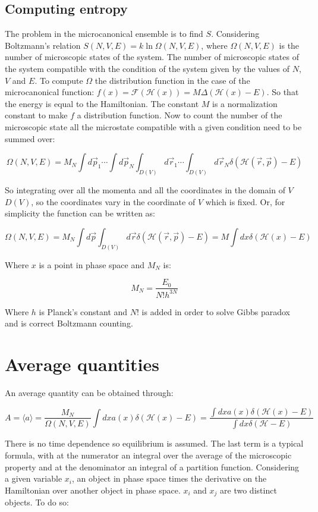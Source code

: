 	\subsection{Computing entropy}
	The problem in the microcanonical ensemble is to find $S$.
	Considering Boltzmann's relation $S(N, V, E) = k\ln\Omega(N, V, E)$, where $\Omega(N, V, E)$ is the number of microscopic states of the system.
	The number of microscopic states of the system compatible with the condition of the system given by the values of $N$, $V$ and $E$.
	To compute $\Omega$ the distribution function in the case of the microcanonical function: $f(x) = \mathcal{F}(\mathcal{H}(x)) = M\Delta(\mathcal{H}(x)-E)$.
	So that the energy is equal to the Hamiltonian.
	The constant $M$ is a normalization constant to make $f$ a distribution function.
	Now to count the number of the microscopic state all the microstate compatible with a given condition need to be summed over:

	$$\Omega(N, V, E) = M_N\int d\vec{p}_1\cdots\int d\vec{p}_N\int_{D(V)}d\vec{r}_1\cdots\int_{D(V)}d\vec{r}_N\delta(\mathcal{H}(\vec{r}, \vec{p})-E)$$

	So integrating over all the momenta and all the coordinates in the domain of $V$ $D(V)$, so the coordinates vary in the coordinate of $V$ which is fixed.
	Or, for simplicity the function can be written as:

	$$\Omega(N, V, E) = M_N\int d\vec{p}\int_{D(V)}d\vec{r}\delta(\mathcal{H}(\vec{r}, \vec{p})-E) = M\int dx\delta(\mathcal{H}(x)-E)$$

	Where $x$ is a point in phase space and $M_N$ is:

	$$M_N = \frac{E_0}{N!h^{3N}}$$

	Where $h$ is Planck's constant and $N!$ is added in order to solve Gibbs paradox and is correct Boltzmann counting.

\section{Average quantities}
	An average quantity can be obtained through:

	$$A = \langle a\rangle = \frac{M_N}{\Omega(N, V, E)}\int dx a(x)\delta(\mathcal{H}(x)-E) = \frac{\int dxa(x)\delta(\mathcal{H}(x)-E)}{\int dx\delta(\mathcal{H}-E)}$$

	There is no time dependence so equilibrium is assumed.
	The last term is a typical formula, with at the numerator an integral over the average of the microscopic property and at the denominator an integral of a partition function.
	Considering a given variable $x_i$, an object in phase space times the derivative on the Hamiltonian over another object in phase space.
	$x_i$ and $x_j$ are two distinct objects.
	To do so:

